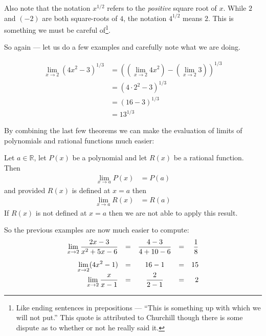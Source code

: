 Also note that the notation $x^{1/2}$ refers to the \emph{positive} square root
of $x$. While $2$ and $(-2)$ are both square-roots of $4$, the notation
$4^{1/2}$ means $2$. This is something we must be careful of\footnote{Like
ending sentences in prepositions --- ``This is something up with which we will
not put.'' This quote is attributed to Churchill though there is some dispute as to
whether or not he really said it.}.

So again --- let us do a few examples and carefully note what we are doing.
\begin{eg}\label{eg_1_4_5}
\begin{align*}
  \lim_{x \to 2} (4x^2-3)^{1/3} &=
  \left( (\lim_{x\to 2} 4x^2) - (\lim_{x \to 2} 3) \right)^{1/3} \\
  &= \left( 4 \cdot 2^2  - 3 \right)^{1/3}\\
  &= \left( 16-3 \right)^{1/3} \\
  &= 13^{1/3}
\end{align*}
\end{eg}

By combining the last few theorems we can make the evaluation of limits of
polynomials and rational functions much easier:
\begin{theorem}\label{thm_1_4_1}
Let $a \in \mathbb{R}$, let $P(x)$ be a polynomial and let $R(x)$ be a rational
function. Then
\begin{align*}
  \lim_{x \to a} P(x) &= P(a)
\end{align*}
and provided $R(x)$ is defined at $x=a$ then
\begin{align*}
  \lim_{x \to a} R(x) &= R(a)
\end{align*}
If $R(x)$ is not defined at $x=a$ then we are not able to apply this result.
\end{theorem}
So the previous examples are now much easier to compute:
\begin{align*}
\begin{array}{rcccr}
  \displaystyle\lim_{x \to 2} \frac{2x-3}{x^2+5x-6} &=& \displaystyle \frac{4-3}{4+10-6} &=&
\displaystyle \frac{1}{8}\\[3ex]
  \displaystyle\lim_{x\to 2} (4x^2-1) &=& 16-1 &=& 15 \\[1ex]
  \displaystyle\lim_{x\to 2} \frac{x}{x-1} &=& \displaystyle \frac{2}{2-1} &=& 2
\end{array}
\end{align*}


